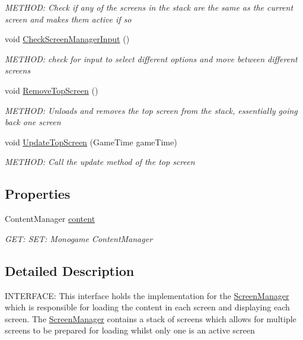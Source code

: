 \begin{DoxyCompactItemize}
\begin{DoxyCompactList}\small\item\em M\+E\+T\+H\+OD\+: Check if any of the screens in the stack are the same as the current screen and makes them active if so \end{DoxyCompactList}\item 
void \hyperlink{a00470_a833b8050119cd9a87efbfa23197457c9}{Check\+Screen\+Manager\+Input} ()
\begin{DoxyCompactList}\small\item\em M\+E\+T\+H\+OD\+: check for input to select different options and move between different screens \end{DoxyCompactList}\item 
void \hyperlink{a00470_a91b5204271edf5e137a85d3f8f3876d8}{Remove\+Top\+Screen} ()
\begin{DoxyCompactList}\small\item\em M\+E\+T\+H\+OD\+: Unloads and removes the top screen from the stack, essentially going back one screen \end{DoxyCompactList}\item 
void \hyperlink{a00470_aff4347b40d3fd6173e0c420adbf1146f}{Update\+Top\+Screen} (Game\+Time game\+Time)
\begin{DoxyCompactList}\small\item\em M\+E\+T\+H\+OD\+: Call the update method of the top screen \end{DoxyCompactList}\end{DoxyCompactItemize}
\subsection*{Properties}
\begin{DoxyCompactItemize}
\item 
Content\+Manager \hyperlink{a00470_a6409574161f945f4b0bd089fcc7e1014}{content}
\begin{DoxyCompactList}\small\item\em G\+ET\+: S\+ET\+: Monogame Content\+Manager \end{DoxyCompactList}\end{DoxyCompactItemize}


\subsection{Detailed Description}
I\+N\+T\+E\+R\+F\+A\+CE\+: This interface holds the implementation for the \hyperlink{a00538}{Screen\+Manager} which is responsible for loading the content in each screen and displaying each screen. The \hyperlink{a00538}{Screen\+Manager} contains a stack of screens which allows for multiple screens to be prepared for loading whilst only one is an active screen 



